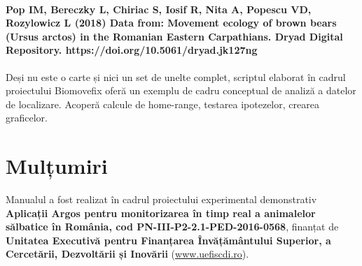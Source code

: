 \documentclass[11pt,onehalfspacing]{elife}
\begin{document}
\paragraph{Pop IM, Bereczky L, Chiriac S, Iosif R, Nita A, Popescu VD, Rozylowicz L (2018) Data from: Movement ecology of brown bears (Ursus arctos) in the Romanian Eastern Carpathians. Dryad Digital Repository. https://doi.org/10.5061/dryad.jk127ng}

Deși nu este o carte și nici un set de unelte complet, scriptul elaborat în cadrul proiectului Biomovefix oferă un exemplu de cadru conceptual de analiză a datelor de localizare. Acoperă calcule de home-range, testarea ipotezelor, crearea graficelor.

\section{Mulțumiri}
Manualul a fost realizat în cadrul proiectului experimental demonstrativ \textbf{Aplicații Argos pentru monitorizarea în timp real a animalelor sălbatice în România, cod PN-III-P2-2.1-PED-2016-0568}, finanțat de \textbf{Unitatea Executivă pentru Finanțarea Învățământului Superior, a Cercetării, Dezvoltării și Inovării} (\url{www.uefiscdi.ro}).


\end{document}
